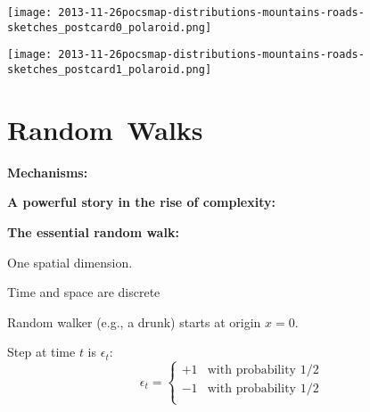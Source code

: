 





  \texttt{[image: 2013-11-26pocsmap-distributions-mountains-roads-sketches\_postcard0\_polaroid.png]}

  \texttt{[image: 2013-11-26pocsmap-distributions-mountains-roads-sketches\_postcard1\_polaroid.png]}

\section{Random\ Walks}

  \textbf{Mechanisms:}

  \textbf{A powerful story in the rise of complexity:}
    
    
    
    
  

  \textbf{The essential random walk:}
    
    
      One spatial dimension.
    
      Time and space are discrete
    
      Random walker (e.g., a drunk) starts at origin $x=0$.
    
      Step at time $t$ is $\epsilon_t$:
      $$
      \epsilon_t = 
      \left\{
        \begin{array}{ll}
          +1 & \mbox{with probability 1/2} \\
          -1 & \mbox{with probability 1/2} \\
        \end{array}
      \right.
      $$
    

